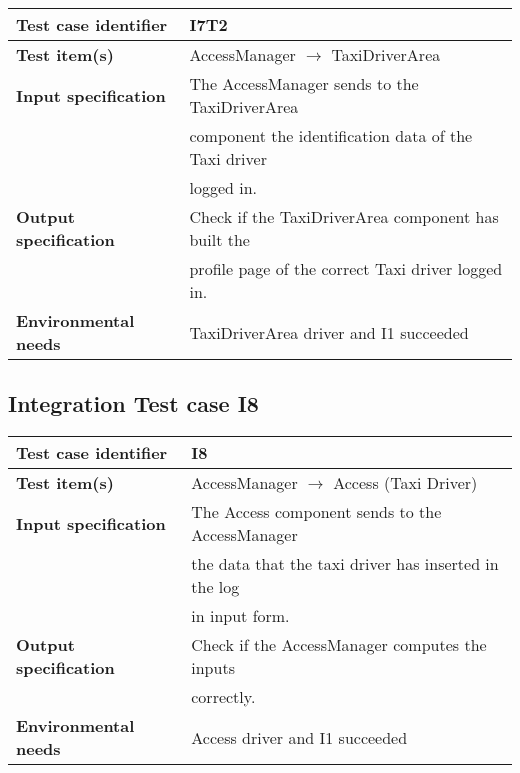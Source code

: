 		\vspace{1cm}
		\noindent
		\begin{adjustbox}{max width=\textwidth}
			\begin{tabular}{ l l}
				\hline 		\textbf{Test case identifier} & I7T2 \\
				\hline		\textbf{Test item(s)}  & AccessManager $\rightarrow$ TaxiDriverArea \\
				\hline		\textbf{Input specification} & The AccessManager sends to the TaxiDriverArea \\ & component the identification data of the Taxi driver\\ & logged in.\\
				\hline		\textbf{Output specification} & Check if the TaxiDriverArea component has built the\\ & profile page of the correct Taxi driver logged in.\\
				\hline		\textbf{Environmental needs} & TaxiDriverArea driver and I1 succeeded\\
				\hline
			\end{tabular}
		\end{adjustbox}
	
	\hypertarget{chapter 3.8}{ }
	\subsection{Integration Test case I8}
		\begin{adjustbox}{max width=\textwidth}
			\begin{tabular}{ l l}
				\hline 		\textbf{Test case identifier} & I8 \\
				\hline		\textbf{Test item(s)}  & AccessManager $\rightarrow$ Access (Taxi Driver) \\
				\hline		\textbf{Input specification} & The Access component sends to the AccessManager \\ & the data that the taxi driver has inserted in the log\\& in input form.\\
				\hline		\textbf{Output specification} & Check if the AccessManager computes the inputs\\ & correctly.\\
				\hline		\textbf{Environmental needs} & Access driver and I1 succeeded\\
				\hline
			\end{tabular}
		\end{adjustbox}
	
	\hypertarget{chapter 3.9}{ }
